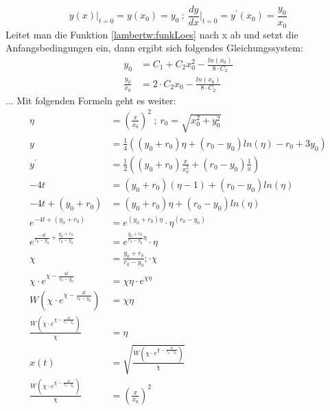 \begin{equation}
	y(x)\big \vert_{t=0}
	=
	y(x_0)
	= 
	y_0
	\:;\:
	\frac{dy}{dx}\bigg \vert_{t=0}
	=
	y^{\prime}(x_0)
	=
	\frac{y_0}{x_0}
\end{equation}
Leitet man die Funktion \eqref{lambertw:funkLoes} nach x ab und setzt die Anfangsbedingungen ein, dann ergibt sich folgendes Gleichungssystem:
\begin{subequations}
	\begin{align}
		y_0
		&=
		C_1 + C_2 x^2_0 - \frac{ln(x_0)}{8 \cdot C_2} \\
		\frac{y_0}{x_0}
		&=
		 2 \cdot  C_2 x_0 - \frac{ln(x_0)}{8 \cdot C_2}
	\end{align}
\end{subequations}
... Mit folgenden Formeln geht es weiter:
\begin{align*}
	\eta
	&=
	\left(\frac{x}{x_0}\right)^2 
	\:;\:
	r_0
	=
	\sqrt{x_0^2+y_0^2} \\
	y
	&=
	\frac{1}{4}\left(\left(y_0+r_0\right)\eta+\left(r_0-y_0\right)ln\left(\eta\right)-r_0+3y_0\right) \\
	y^\prime
	&=
	\frac{1}{2}\left(\left(y_0+r_0\right)\frac{x}{x_0^2}+\left(r_0-y_0\right)\frac{1}{x}\right) \\
	-4t
	&=
	\left(y_0+r_0\right)\left(\eta-1\right)+\left(r_0-y_0\right)ln\left(\eta\right) \\
	-4t+\left(y_0+r_0\right)
	&=
	\left(y_0+r_0\right)\eta+\left(r_0-y_0\right)ln\left(\eta\right) \\
	e^{-4t+\left(y_0+r_0\right)}
	&=
	e^{\left(y_0+r_0\right)\eta}\cdot\eta^{\left(r_0-y_0\right)} \\
	e^{\frac{-4t}{r_0-y_0}+\frac{y_0+r_0}{r_0-y_0}}
	&=
	e^{\frac{y_0+r_0}{r_0-y_0}\eta}\cdot\eta\  \\
	\chi
	&=
	\frac{y_0+r_0}{r_0-y_0}; \cdot\chi \\
	\chi\cdot e^{\chi-\frac{4t}{r_0-y_0}}
	&=
	\chi\eta\cdot e^{\chi\eta} \\
	W\left(\chi\cdot e^{\chi-\frac{4t}{r_0-y_0}}\right)
	&=
	\chi\eta \\
	\frac{W\left(\chi\cdot e^{\chi-\frac{4t}{r_0-y_0}}\right)}{\chi}
	&=
	\eta \\
	x\left(t\right)
	&=
	\sqrt{\frac{W\left(\chi\cdot e^{\chi-\frac{4t}{r_0-y_0}}\right)}{\chi}} \\
	\frac{W\left(\chi\cdot e^{\chi-\frac{4t}{r_0-y_0}}\right)}{\chi}
	&=
	\left(\frac{x}{x_0}\right)^2
\end{align*}

